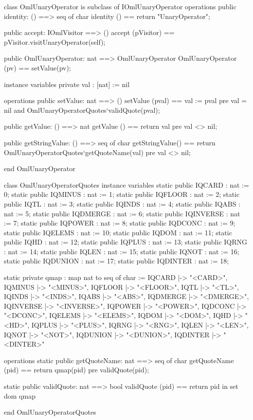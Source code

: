 \begin{vdm_al}
class OmlUnaryOperator is subclass of IOmlUnaryOperator
operations
  public identity: () ==> seq of char
  identity () == return "UnaryOperator";

  public accept: IOmlVisitor ==> ()
  accept (pVisitor) == pVisitor.visitUnaryOperator(self);

  public OmlUnaryOperator: nat ==> OmlUnaryOperator
  OmlUnaryOperator (pv) == setValue(pv);

instance variables
  private val : [nat] := nil

operations
  public setValue: nat ==> ()
  setValue (pval) == val := pval
    pre val = nil and OmlUnaryOperatorQuotes`validQuote(pval);

  public getValue: () ==> nat
  getValue () == return val
    pre val <> nil;

  public getStringValue: () ==> seq of char
  getStringValue() == return OmlUnaryOperatorQuotes`getQuoteName(val)
    pre val <> nil;

end OmlUnaryOperator
\end{vdm_al}
\begin{vdm_al}
class OmlUnaryOperatorQuotes
instance variables
  static public IQCARD : nat := 0;
  static public IQMINUS : nat := 1;
  static public IQFLOOR : nat := 2;
  static public IQTL : nat := 3;
  static public IQINDS : nat := 4;
  static public IQABS : nat := 5;
  static public IQDMERGE : nat := 6;
  static public IQINVERSE : nat := 7;
  static public IQPOWER : nat := 8;
  static public IQDCONC : nat := 9;
  static public IQELEMS : nat := 10;
  static public IQDOM : nat := 11;
  static public IQHD : nat := 12;
  static public IQPLUS : nat := 13;
  static public IQRNG : nat := 14;
  static public IQLEN : nat := 15;
  static public IQNOT : nat := 16;
  static public IQDUNION : nat := 17;
  static public IQDINTER : nat := 18;

  static private qmap : map nat to seq of char :=
    { IQCARD |-> "<CARD>",
      IQMINUS |-> "<MINUS>",
      IQFLOOR |-> "<FLOOR>",
      IQTL |-> "<TL>",
      IQINDS |-> "<INDS>",
      IQABS |-> "<ABS>",
      IQDMERGE |-> "<DMERGE>",
      IQINVERSE |-> "<INVERSE>",
      IQPOWER |-> "<POWER>",
      IQDCONC |-> "<DCONC>",
      IQELEMS |-> "<ELEMS>",
      IQDOM |-> "<DOM>",
      IQHD |-> "<HD>",
      IQPLUS |-> "<PLUS>",
      IQRNG |-> "<RNG>",
      IQLEN |-> "<LEN>",
      IQNOT |-> "<NOT>",
      IQDUNION |-> "<DUNION>",
      IQDINTER |-> "<DINTER>" }

operations
  static public getQuoteName: nat ==> seq of char
  getQuoteName (pid) ==
    return qmap(pid)
    pre validQuote(pid);

  static public validQuote: nat ==> bool
  validQuote (pid) == return pid in set dom qmap

end OmlUnaryOperatorQuotes
\end{vdm_al}
